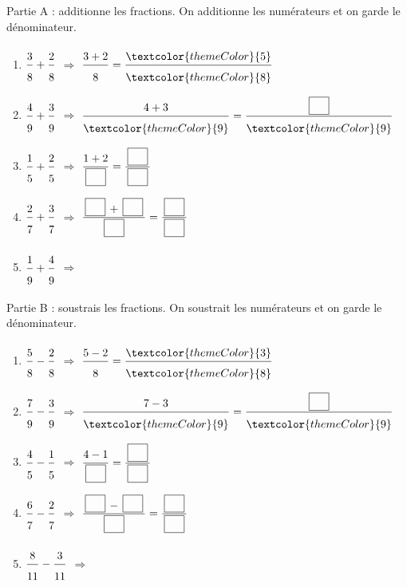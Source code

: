 \newpage


\medskip
\textcolor{themeColor}{Partie A} : additionne les fractions. On additionne les numérateurs et on garde le dénominateur.

\begin{enumerate}[leftmargin=*,align=parleft, label=\alph*), itemsep=9pt]
\item $\FA{3}{8}+\FA{2}{8}$ \quad $\Longrightarrow$ \quad $\FA{3 + 2}{8}=\FA{\textcolor{themeColor}{5}}{\textcolor{themeColor}{8}}$
\item $\FA{4}{9}+\FA{3}{9}$ \quad $\Longrightarrow$ \quad $\FA{4 + 3}{\textcolor{themeColor}{9}}=\FA{\CaseC}{\textcolor{themeColor}{9}}$
\item $\FA{1}{5}+\FA{2}{5}$ \quad $\Longrightarrow$ \quad $\FA{1 + 2}{\CaseC}=\FA{\CaseC}{\CaseC}$
\item $\FA{2}{7}+\FA{3}{7}$ \quad $\Longrightarrow$ \quad $\FA{\CaseC + \CaseC}{\CaseC}=\FA{\CaseC}{\CaseC}$
\item $\FA{1}{9}+\FA{4}{9}$ \quad $\Longrightarrow$
\end{enumerate}

\medskip
\textcolor{themeColor}{Partie B} : soustrais les fractions. On soustrait les numérateurs et on garde le dénominateur.

\begin{enumerate}[leftmargin=*,align=parleft, label=\alph*), itemsep=9pt, start=6]
\item $\FA{5}{8}-\FA{2}{8}$ \quad $\Longrightarrow$ \quad $\FA{5 - 2}{8}=\FA{\textcolor{themeColor}{3}}{\textcolor{themeColor}{8}}$
\item $\FA{7}{9}-\FA{3}{9}$ \quad $\Longrightarrow$ \quad $\FA{7 - 3}{\textcolor{themeColor}{9}}=\FA{\CaseC}{\textcolor{themeColor}{9}}$
\item $\FA{4}{5}-\FA{1}{5}$ \quad $\Longrightarrow$ \quad $\FA{4 - 1}{\CaseC}=\FA{\CaseC}{\CaseC}$
\item $\FA{6}{7}-\FA{2}{7}$ \quad $\Longrightarrow$ \quad $\FA{\CaseC - \CaseC}{\CaseC}=\FA{\CaseC}{\CaseC}$
\item $\FA{8}{11}-\FA{3}{11}$ \quad $\Longrightarrow$
\end{enumerate}

\newpage


